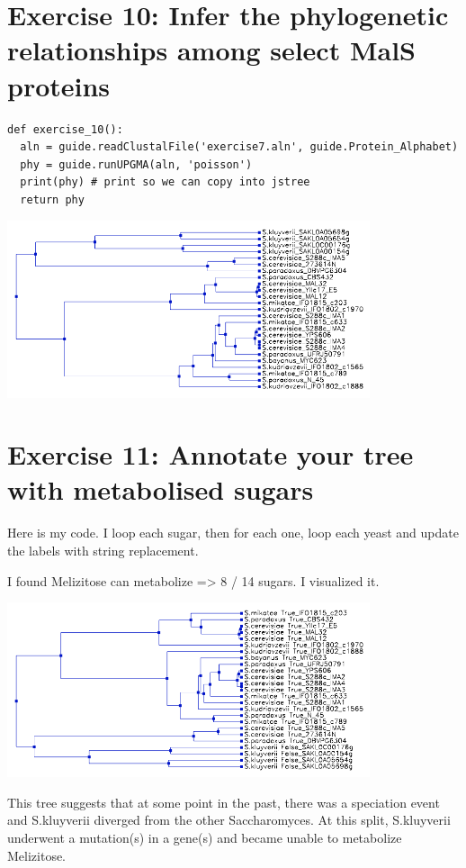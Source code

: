 \documentclass{article} %
\begin{document}
\section{Exercise 10: Infer the phylogenetic relationships among select MalS proteins}

\begin{verbatim}
def exercise_10():
  aln = guide.readClustalFile('exercise7.aln', guide.Protein_Alphabet)
  phy = guide.runUPGMA(aln, 'poisson')
  print(phy) # print so we can copy into jstree 
  return phy
\end{verbatim}

\includegraphics[width=0.8\textwidth]{tree.png}

\section{Exercise 11: Annotate your tree with metabolised sugars}

Here is my code. I loop each sugar, then for each one, loop each yeast and update the labels with string replacement.


I found Melizitose can metabolize => 8 / 14 sugars. I visualized it.

\includegraphics[width=0.8\textwidth]{tree2.png}

This tree suggests that at some point in the past, there was a speciation event and S.kluyverii diverged from the other Saccharomyces. At this split, S.kluyverii underwent a mutation(s) in a gene(s) and became unable to metabolize Melizitose.
\end{document}

